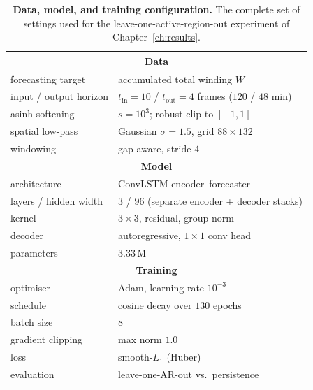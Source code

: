 \begin{table}[!htbp]
\centering
\small
\caption[Hyperparameters]{\textbf{Data, model, and training configuration.} The
complete set of settings used for the leave-one-active-region-out experiment of
Chapter~\ref{ch:results}.}
\label{tab:hparams}
\renewcommand{\arraystretch}{1.2}
\begin{tabular}{|l|l|}
\hline
\multicolumn{2}{|c|}{\textbf{Data}} \\
\hline\hline
forecasting target        & accumulated total winding $W$ \\ \hline
input / output horizon    & $t_{\text{in}}=10$ / $t_{\text{out}}=4$ frames ($120$ / $48$ min) \\ \hline
asinh softening           & $s = 10^{3}$; robust clip to $[-1,1]$ \\ \hline
spatial low-pass          & Gaussian $\sigma = 1.5$, grid $88\times132$ \\ \hline
windowing                 & gap-aware, stride $4$ \\
\hline\hline
\multicolumn{2}{|c|}{\textbf{Model}} \\
\hline\hline
architecture              & ConvLSTM encoder--forecaster \\ \hline
layers / hidden width     & $3$ / $96$ (separate encoder + decoder stacks) \\ \hline
kernel                    & $3\times3$, residual, group norm \\ \hline
decoder                   & autoregressive, $1\times1$ conv head \\ \hline
parameters                & $3.33$\,M \\
\hline\hline
\multicolumn{2}{|c|}{\textbf{Training}} \\
\hline\hline
optimiser                 & Adam, learning rate $10^{-3}$ \\ \hline
schedule                  & cosine decay over $130$ epochs \\ \hline
batch size                & $8$ \\ \hline
gradient clipping         & max norm $1.0$ \\ \hline
loss                      & smooth-$L_1$ (Huber) \\ \hline
evaluation                & leave-one-AR-out vs.\ persistence \\
\hline
\end{tabular}
\end{table}
